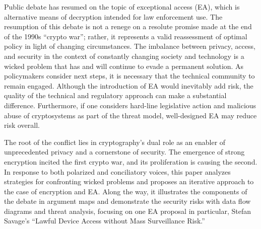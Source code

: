 
Public debate has resumed on the topic of exceptional access (EA), which is alternative means of decryption intended for
law enforcement use. The resumption of this debate is not a renege on a resolute promise made at the end of the 1990s
``crypto war''; rather, it represents a valid reassessment of optimal policy in light of changing circumstances. The
imbalance between privacy, access, and security in the context of constantly changing society and technology is a wicked
problem that has and will continue to evade a permanent solution. As policymakers consider next steps, it is necessary
that the technical community to remain engaged. Although the introduction of EA would inevitably add risk, the quality
of the technical and regulatory approach can make a substantial difference. Furthermore, if one considers hard-line
legislative action and malicious abuse of cryptosystems as part of the threat model, well-designed EA may reduce risk
overall.

The root of the conflict lies in cryptography's dual role as an enabler of unprecedented privacy and a cornerstone of
security. The emergence of strong encryption incited the first crypto war, and its proliferation is causing the second.
In response to both polarized and conciliatory voices, this paper analyzes strategies for confronting wicked problems
and proposes an iterative approach to the case of encryption and EA. Along the way, it illustrates the components of the
debate in argument maps and demonstrate the security risks with data flow diagrams and threat analysis, focusing on one
EA proposal in particular, Stefan Savage's ``Lawful Device Access without Mass Surveillance Risk.''
